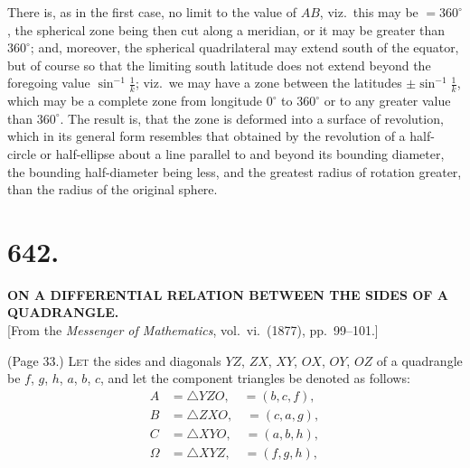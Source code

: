 \documentclass[11pt,a4paper]{article}
\begin{document}
There is, as in the first case, no limit to the value of $AB$, viz.\ this may be $= 360^\circ$, the spherical zone being then cut along a meridian, or it may be greater than $360^\circ$; and, moreover, the spherical quadrilateral may extend south of the equator, but of course so that the limiting south latitude does not extend beyond the foregoing value $\sin^{-1} \frac{1}{k}$; viz.\ we may have a zone between the latitudes $\pm \sin^{-1} \frac{1}{k}$, which may be a complete zone from longitude $0^\circ$ to $360^\circ$ or to any greater value than $360^\circ$. The result is, that the zone is deformed into a surface of revolution, which in its general form resembles that obtained by the revolution of a half-circle or half-ellipse about a line parallel to and beyond its bounding diameter, the bounding half-diameter being less, and the greatest radius of rotation greater, than the radius of the original sphere.

\bigskip


\section*{642.}

\begin{center}
\textbf{ON A DIFFERENTIAL RELATION BETWEEN THE SIDES OF A\\QUADRANGLE.}\\[1em]
[From the \textit{Messenger of Mathematics}, vol.~vi.\ (1877), pp.\ 99--101.]
\end{center}

\medskip

\noindent (Page 33.) \textsc{Let} the sides and diagonals $YZ$, $ZX$, $XY$, $OX$, $OY$, $OZ$ of a quadrangle be $f$, $g$, $h$, $a$, $b$, $c$, and let the component triangles be denoted as follows:
\begin{align*}
A &= \triangle YZO, \quad = (b, c, f), \\
B &= \triangle ZXO, \quad = (c, a, g), \\
C &= \triangle XYO, \quad = (a, b, h), \\
\Omega &= \triangle XYZ, \quad = (f, g, h),
\end{align*}
\end{document}
